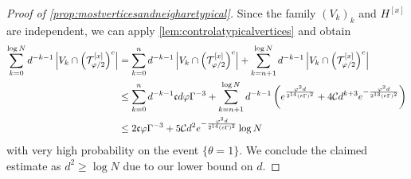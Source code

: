 \documentclass[10pt,a4paper]{amsart}
\newcommand{\abs}[1]{\left| #1 \right|}
\newcommand{\ccc}{\mathfrak{c}}
\numberwithin{equation}{section}
\newcommand*\bset[1]{[#1]}
\newcommand{\nc}{\normalcolor}
\begin{document}
\begin{proof}[Proof of \cref{prop:mostverticesandneigharetypical}]
			Since the family $(V_k)_{k}$ and $H^{\bset{x}}$ are independent, we can apply \cref{lem:controlatypicalvertices} and obtain
		\begin{align*}
			\sum_{k=0}^{\log N} d^{-k-1}\abs{V_k \cap\left(\mathcal{T}^{\bset{x}}_{\varphi/2}\right)^c} &= \sum_{k=0}^{n} d^{-k-1}\abs{V_k \cap\left(\mathcal{T}^{\bset{x}}_{\varphi/2}\right)^c}  + \sum_{k=n+1}^{\log N} d^{-k-1}\abs{V_k \cap\left(\mathcal{T}^{\bset{x}}_{\varphi/2}\right)^c}  \\
			&\le \sum_{k=0}^{n} d^{-k-1} \ccc d\varphi\Gamma^{-3}  + \sum_{k=n+1}^{\log N} d^{-k-1}\left( e^{\frac{\varphi^2d}{2^{14} (e\Gamma)^2}}  + 4\mathcal C d^{k+3} e^{-\frac{\varphi^2d}{2^{13} (e\Gamma)^2}}\nc \right)\\
			&\le 2 \ccc \varphi\Gamma^{-3} +  5\mathcal{C}d^2e^{-\frac{\varphi^2d}{2^{14} (e\Gamma)^2}}\log N
		\end{align*}
		with very high probability on the event $\{ \theta =1 \}$. We conclude the claimed estimate as $d^2 \geq \log N$ due to our lower bound on $d$.
	\end{proof}

	
		
	
\end{document}
